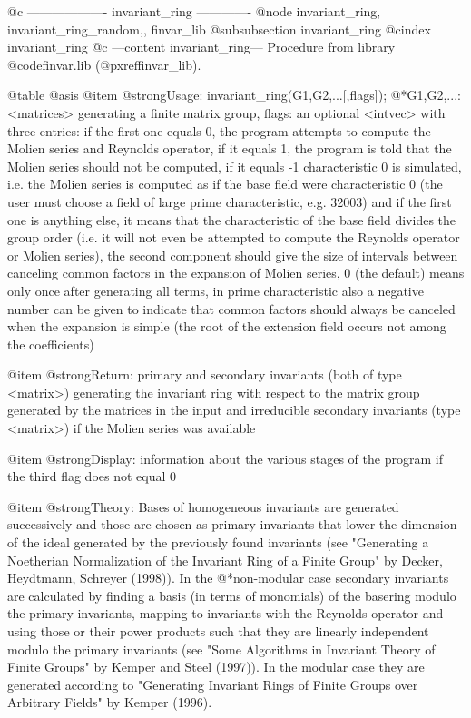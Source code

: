 @c ------------------- invariant_ring -------------
@node invariant_ring, invariant_ring_random,, finvar_lib
@subsubsection invariant_ring
@cindex invariant_ring
@c ---content invariant_ring---
Procedure from library @code{finvar.lib} (@pxref{finvar_lib}).

@table @asis
@item @strong{Usage:}
invariant_ring(G1,G2,...[,flags]);
@*G1,G2,...: <matrices> generating a finite matrix group, flags: an
optional <intvec> with three entries: if the first one equals 0, the
program attempts to compute the Molien series and Reynolds operator,
if it equals 1, the program is told that the Molien series should not
be computed, if it equals -1 characteristic 0 is simulated, i.e. the
Molien series is computed as if the base field were characteristic 0
(the user must choose a field of large prime characteristic, e.g.
32003) and if the first one is anything else, it means that the
characteristic of the base field divides the group order (i.e. it will
not even be attempted to compute the Reynolds operator or Molien
series), the second component should give the size of intervals
between canceling common factors in the expansion of Molien series, 0
(the default) means only once after generating all terms, in prime
characteristic also a negative number can be given to indicate that
common factors should always be canceled when the expansion is simple
(the root of the extension field occurs not among the coefficients)

@item @strong{Return:}
primary and secondary invariants (both of type <matrix>) generating
the invariant ring with respect to the matrix group generated by the
matrices in the input and irreducible secondary invariants (type
<matrix>) if the Molien series was available

@item @strong{Display:}
information about the various stages of the program if the third flag
does not equal 0

@item @strong{Theory:}
Bases of homogeneous invariants are generated successively and those
are chosen as primary invariants that lower the dimension of the ideal
generated by the previously found invariants (see "Generating a
Noetherian Normalization of the Invariant Ring of a Finite Group" by
Decker, Heydtmann, Schreyer (1998)). In the
@*non-modular case secondary invariants are calculated by finding a
basis (in terms of monomials) of the basering modulo the primary
invariants, mapping to invariants with the Reynolds operator and using
those or their power products such that they are linearly independent
modulo the primary invariants (see "Some Algorithms in Invariant
Theory of Finite Groups" by Kemper and Steel (1997)). In the modular
case they are generated according to "Generating Invariant Rings of
Finite Groups over Arbitrary Fields" by Kemper (1996).

